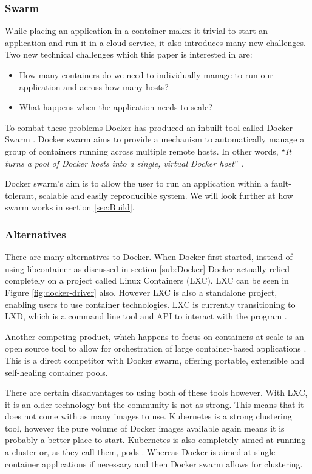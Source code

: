 \documentclass{article}
\begin{document}
\subsubsection{Swarm}
\label{subs:Swarm}
While placing an application in a container makes it trivial to start an application and run it in a cloud service, it also introduces many new challenges. Two new technical challenges which this paper is interested in are:
\begin{itemize}
  \item How many containers do we need to individually manage to run our application and across how many hosts? 
  \item What happens when the application needs to scale? 
\end{itemize}

To combat these problems Docker has produced an inbuilt tool called Docker Swarm \citep{Swarm2016}. Docker swarm aims to provide a mechanism to automatically manage a group of containers running across multiple remote hosts. In other words, ``\textit{It turns a pool of Docker hosts into a single, virtual Docker host}'' \citep{Swarm2016}.

Docker swarm's aim is to allow the user to run an application within a fault-tolerant, scalable and easily reproducible system. We will look further at how swarm works in section \ref{sec:Build}.

\subsubsection{Alternatives}
\label{subs:Docker-alt}
There are many alternatives to Docker. When Docker first started, instead of using libcontainer as discussed in section \ref{sub:Docker} Docker actually relied completely on a project called Linux Containers (LXC). LXC can be seen in Figure \ref{fig:docker-driver} also. However LXC is also a standalone project, enabling users to use container technologies. LXC is currently transitioning to LXD, which is a command line tool and API to interact with the program \citep{LXC2016}. 

Another competing product, which happens to focus on containers at scale is an open source tool to allow for orchestration of large container-based applications \citep{Kubernetes2016}. This is a direct competitor with Docker swarm, offering portable, extensible and self-healing container pools.

There are certain disadvantages to using both of these tools however. With LXC, it is an older technology but the community is not as strong. This means that it does not come with as many images to use. Kubernetes is a strong clustering tool, however the pure volume of Docker images available again means it is probably a better place to start. Kubernetes is also completely aimed at running a cluster or, as they call them, pods \citep{Kubernetes2016}. Whereas Docker is aimed at single container applications if necessary and then Docker swarm allows for clustering.
\end{document}
